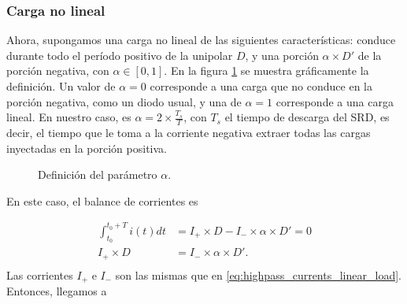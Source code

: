 \subsubsection{Carga no lineal}

Ahora, supongamos una carga no lineal de las siguientes características: conduce
durante todo el período positivo de la unipolar $D$, y una porción $\alpha
\times D'$ de la porción negativa, con $\alpha \in \left[0, 1 \right]$. En la
figura \ref{fig:alpha_definition_plot} se muestra gráficamente la definición. Un
valor de $\alpha=0$ corresponde a una carga que no conduce en la porción
negativa, como un diodo usual, y una de $\alpha=1$ corresponde a una carga
lineal. En nuestro caso, es $\alpha = 2 \times \frac{T_s}{T}$, con $T_s$ el
tiempo de descarga del SRD, es decir, el tiempo que le toma  a la corriente
negativa extraer todas las cargas inyectadas en la porción positiva.

\begin{figure}[h!]
    \begin{center}
    \end{center}
    \caption{Definición del parámetro $\alpha$.}
    \label{fig:alpha_definition_plot}
\end{figure}

En este caso, el balance de corrientes es

\begin{equation}
    \label{eq:current_balance_capacitor_linear_load}
    \begin{aligned}
        \int_{t_0}^{t_0+T} i(t)dt &= I_+ \times D - I_- \times \alpha \times D' = 0 \\
        I_+ \times D &= I_- \times \alpha \times D'. \\
    \end{aligned}
\end{equation}
Las corrientes $I_+$ e $I_-$ son las mismas que en
\ref{eq:highpass_currents_linear_load}. Entonces, llegamos a

